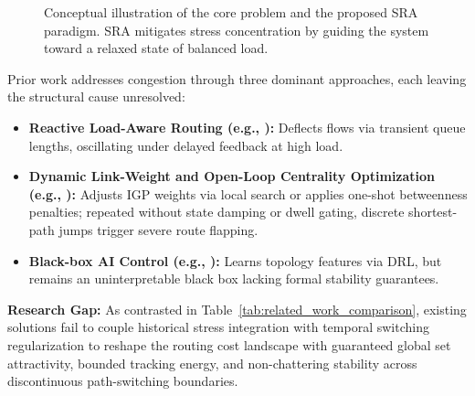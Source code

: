\documentclass{ccjnl}
\newcommand{\rev}[1]{#1}
\def\rev#1{#1}%
\begin{document}
\begin{figure}[!t]
{\begin{minipage}{0.46\columnwidth}
    \end{minipage}
    }
    
    \caption{Conceptual illustration of the core problem and the proposed SRA paradigm. SRA mitigates stress concentration by guiding the system toward a relaxed state of balanced load.}
    \label{fig:intro_scenario}
\end{figure}

Prior work addresses congestion through \rev{three} dominant approaches, each leaving the structural cause unresolved:
\begin{itemize}
    \item \textbf{Reactive Load-Aware Routing (e.g., \cite{Macabale2020Cradle}):} Deflects flows via transient queue lengths, oscillating under delayed feedback at high load.
    \item \rev{\textbf{Dynamic Link-Weight and Open-Loop Centrality Optimization (e.g., \cite{Fortz2000OSPF,Upadhyay2024OpticalBC}):} Adjusts IGP weights via local search or applies one-shot betweenness penalties; repeated without state damping or dwell gating, discrete shortest-path jumps trigger severe route flapping.}
    \item \textbf{Black-box AI Control (e.g., \cite{Wei2023GRLPS}):} Learns topology features via DRL, but remains an uninterpretable black box lacking formal stability guarantees.
\end{itemize}

\rev{\textbf{Research Gap:} As contrasted in Table~\ref{tab:related_work_comparison}, existing solutions fail to couple historical stress integration with temporal switching regularization to reshape the routing cost landscape with guaranteed global set attractivity, bounded tracking energy, and non-chattering stability across discontinuous path-switching boundaries.}
\end{document}
